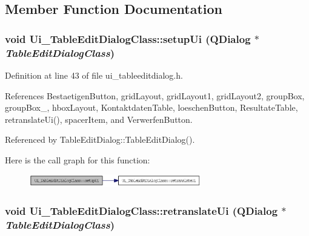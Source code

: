 \subsection{Member Function Documentation}
\hypertarget{class_ui___table_edit_dialog_class_a2daa38830f3a3d673e96af45346c219}{
\subsubsection[setupUi]{\setlength{\rightskip}{0pt plus 5cm}void Ui\_\-TableEditDialogClass::setupUi (QDialog $\ast$ {\em TableEditDialogClass})}}
\label{class_ui___table_edit_dialog_class_a2daa38830f3a3d673e96af45346c219}




Definition at line 43 of file ui\_\-tableeditdialog.h.

References BestaetigenButton, gridLayout, gridLayout1, gridLayout2, groupBox, groupBox\_, hboxLayout, KontaktdatenTable, loeschenButton, ResultateTable, retranslateUi(), spacerItem, and VerwerfenButton.

Referenced by TableEditDialog::TableEditDialog().

Here is the call graph for this function:\nopagebreak
\begin{figure}[H]
\begin{center}
\leavevmode
\includegraphics[width=213pt]{class_ui___table_edit_dialog_class_a2daa38830f3a3d673e96af45346c219_cgraph}
\end{center}
\end{figure}
\hypertarget{class_ui___table_edit_dialog_class_547c3697e729090904ba22df709f2e38}{
\subsubsection[retranslateUi]{\setlength{\rightskip}{0pt plus 5cm}void Ui\_\-TableEditDialogClass::retranslateUi (QDialog $\ast$ {\em TableEditDialogClass})}}
\label{class_ui___table_edit_dialog_class_547c3697e729090904ba22df709f2e38}




